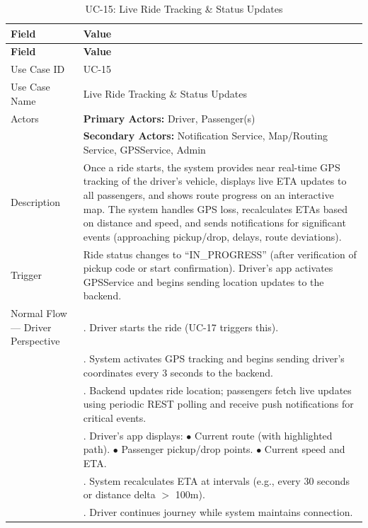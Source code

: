 \begin{longtable}{|>{\raggedright\arraybackslash}p{4cm}|>{\raggedright\arraybackslash}p{11cm}|}
\caption{UC-15: Live Ride Tracking \& Status Updates}
\label{tab:uc-15} \\
\hline
\rowcolor{lightgray!30}
\textbf{Field} & \textbf{Value} \\
\hline
\endfirsthead
\hline
\rowcolor{lightgray!30}
\textbf{Field} & \textbf{Value} \\
\hline
\endhead
\hline
\endfoot
\hline
\endlastfoot
Use Case ID & UC-15 \\
\hline
Use Case Name & Live Ride Tracking \& Status Updates \\
\hline
Actors & \textbf{Primary Actors:} Driver, Passenger(s) \\
& \textbf{Secondary Actors:} Notification Service, Map/Routing Service, GPSService, Admin \\
\hline
Description & Once a ride starts, the system provides near real-time GPS tracking of the driver’s vehicle, displays live ETA updates to all passengers, and shows route progress on an interactive map. The system handles GPS loss, recalculates ETAs based on distance and speed, and sends notifications for significant events (approaching pickup/drop, delays, route deviations). \\
\hline
Trigger & Ride status changes to “IN\_PROGRESS” (after verification of pickup code or start confirmation). Driver’s app activates GPSService and begins sending location updates to the backend. \\
\hline
Normal Flow — Driver Perspective & 1. Driver starts the ride (UC-17 triggers this). \\
& 2. System activates GPS tracking and begins sending driver’s coordinates every 3 seconds to the backend. \\
& 3. Backend updates ride location; passengers fetch live updates using periodic REST polling and receive push notifications for critical events. \\
& 4. Driver’s app displays: \newline $\bullet$ Current route (with highlighted path). \newline $\bullet$ Passenger pickup/drop points. \newline $\bullet$ Current speed and ETA. \\
& 5. System recalculates ETA at intervals (e.g., every 30 seconds or distance delta $>$ 100m). \\
& 6. Driver continues journey while system maintains connection. \\

\end{longtable}
